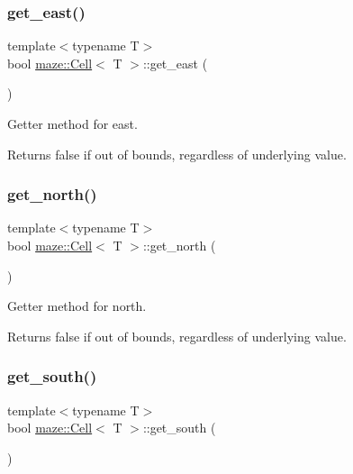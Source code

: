 \subsubsection{\texorpdfstring{get\+\_\+east()}{get\_east()}}
{\footnotesize\ttfamily template$<$typename T$>$ \\
bool \hyperlink{classmaze_1_1Cell}{maze\+::\+Cell}$<$ T $>$\+::get\+\_\+east (\begin{DoxyParamCaption}{ }\end{DoxyParamCaption})}



Getter method for east. 

Returns false if out of bounds, regardless of underlying value. \mbox{\label{classmaze_1_1Cell_a3635bc71ff51d6dee9220817955bbb5d}} 
\subsubsection{\texorpdfstring{get\+\_\+north()}{get\_north()}}
{\footnotesize\ttfamily template$<$typename T$>$ \\
bool \hyperlink{classmaze_1_1Cell}{maze\+::\+Cell}$<$ T $>$\+::get\+\_\+north (\begin{DoxyParamCaption}{ }\end{DoxyParamCaption})}



Getter method for north. 

Returns false if out of bounds, regardless of underlying value. \mbox{\label{classmaze_1_1Cell_aa3d4aabbfb3434fa30dac654c34a78c1}} 
\subsubsection{\texorpdfstring{get\+\_\+south()}{get\_south()}}
{\footnotesize\ttfamily template$<$typename T$>$ \\
bool \hyperlink{classmaze_1_1Cell}{maze\+::\+Cell}$<$ T $>$\+::get\+\_\+south (\begin{DoxyParamCaption}{ }\end{DoxyParamCaption})}



